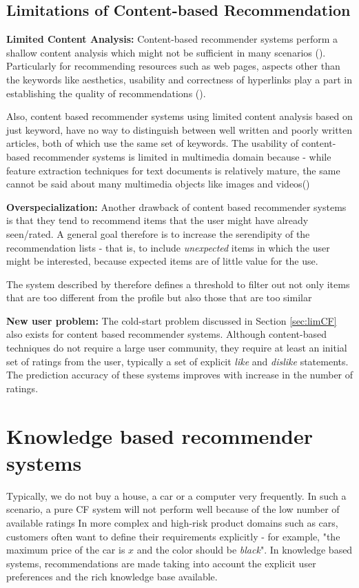 \subsection{Limitations of Content-based Recommendation}
\textbf{Limited Content Analysis:} Content-based recommender systems perform a shallow content analysis which might not be sufficient in many scenarios (\cite{jannach}). Particularly for recommending resources such as web pages, aspects other than the keywords like aesthetics, usability and correctness of hyperlinks play a part in establishing the quality of recommendations (\cite{jannach}).

Also, content based recommender systems using limited content analysis based on just keyword, have no way to distinguish between well written and poorly written articles, both of which use the same set of keywords. 
The usability of content-based recommender systems is limited in multimedia domain because - while feature extraction techniques for text documents is relatively mature, the same cannot be said about many multimedia objects like images and videos(\cite{adom2005})

\textbf{Overspecialization:}  Another drawback of content based recommender systems is that they tend to recommend items that the user might have already seen/rated. 
A general goal therefore is to increase the serendipity of the recommendation lists - that is, to include \textit{unexpected} items in which the user might be interested, because expected items are of little value for the use.

The system described by \cite{billsus} therefore defines a threshold to filter out not only items that are too different from the profile but also those that are too similar

\textbf{New user problem:} The cold-start problem discussed in Section \ref{sec:limCF} also exists for content based recommender systems.
Although content-based techniques do not require a large user community, they require at least an initial set of ratings from the user, typically a set of explicit \textit{like} and \textit{dislike} statements.
The prediction accuracy of these systems improves with increase in the number of ratings.

\section{Knowledge based recommender systems}
Typically, we do not buy a house, a car or a computer very frequently. In such a scenario, a pure CF system will not perform well because of the low number of available ratings
In more complex and high-risk product domains such as cars, customers often want to define their requirements explicitly - for example, "the maximum price of the car is $x$ and the color should be \textit{black}". In knowledge based systems, recommendations are made taking into account the explicit user preferences and the rich knowledge base available.

